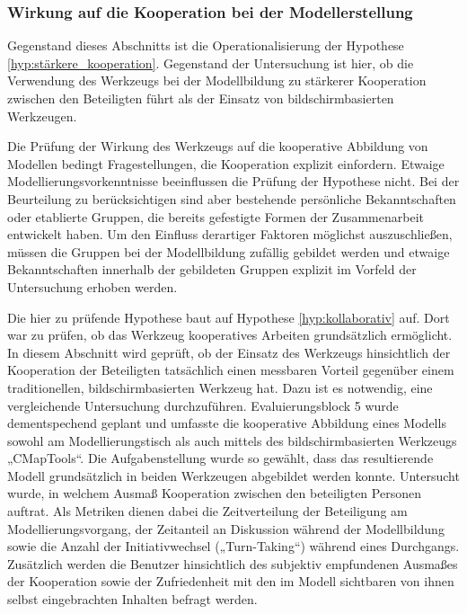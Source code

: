 
\subsubsection{Wirkung auf die Kooperation bei der Modellerstellung} %
\label{ssub:wirkung_auf_die_kooperation_bei_der_modellerstellung}

Gegenstand dieses Abschnitts ist die Operationalisierung der Hypothese \ref{hyp:stärkere_kooperation}. Gegenstand der Untersuchung ist hier, ob die Verwendung des Werkzeugs bei der Modellbildung zu stärkerer Kooperation zwischen den Beteiligten führt als der Einsatz von bildschirmbasierten Werkzeugen.

Die Prüfung der Wirkung des Werkzeugs auf die kooperative Abbildung von Modellen bedingt Fragestellungen, die Kooperation explizit einfordern. Etwaige Modellierungsvorkenntnisse beeinflussen die Prüfung der Hypothese nicht. Bei der Beurteilung zu berücksichtigen sind aber bestehende persönliche Bekanntschaften oder etablierte Gruppen, die bereits gefestigte Formen der Zusammenarbeit entwickelt haben. Um den Einfluss derartiger Faktoren möglichst auszuschließen, müssen die Gruppen bei der Modellbildung zufällig gebildet werden und etwaige Bekanntschaften innerhalb der gebildeten Gruppen explizit im Vorfeld der Untersuchung erhoben werden.

Die hier zu prüfende Hypothese baut auf Hypothese \ref{hyp:kollaborativ} auf. Dort war zu prüfen, ob das Werkzeug kooperatives Arbeiten grundsätzlich ermöglicht. In diesem Abschnitt wird geprüft, ob der Einsatz des Werkzeugs hinsichtlich der Kooperation der Beteiligten tatsächlich einen messbaren Vorteil gegenüber einem traditionellen, bildschirmbasierten Werkzeug hat. Dazu ist es notwendig, eine vergleichende Untersuchung durchzuführen. Evaluierungsblock 5 wurde dementspechend geplant und umfasste die kooperative Abbildung eines Modells sowohl am Modellierungstisch als auch mittels des bildschirmbasierten Werkzeugs „CMapTools“. Die Aufgabenstellung wurde so gewählt, dass das resultierende Modell grundsätzlich in beiden Werkzeugen abgebildet werden konnte. Untersucht wurde, in welchem Ausmaß Kooperation zwischen den beteiligten Personen auftrat. Als Metriken dienen dabei die Zeitverteilung der Beteiligung am Modellierungsvorgang, der Zeitanteil an Diskussion während der Modellbildung sowie die Anzahl der Initiativwechsel („Turn-Taking“) während eines Durchgangs. Zusätzlich werden die Benutzer hinsichtlich des subjektiv empfundenen Ausmaßes der Kooperation sowie der Zufriedenheit mit den im Modell sichtbaren von ihnen selbst eingebrachten Inhalten befragt werden.

